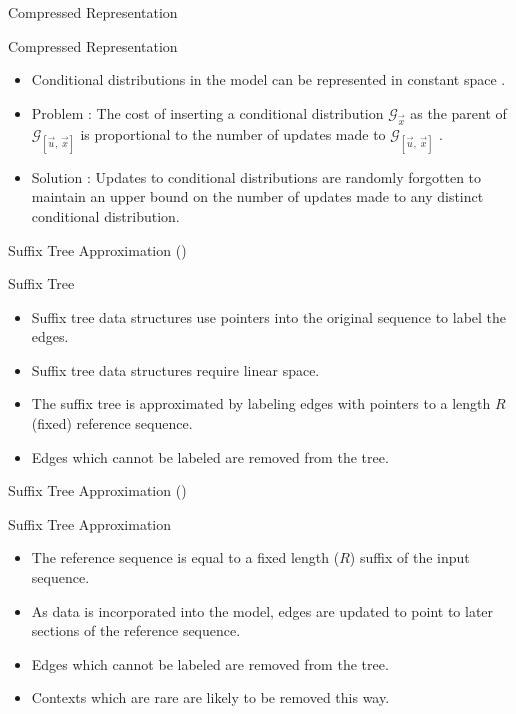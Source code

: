 \documentclass{beamer}
\newcommand{\G}{\mathcal{G}}
\begin{document}
\begin{frame}[t]{Compressed Representation}	
	\begin{block}{Compressed Representation \cite{Gasthaus2011}}
		\begin{itemize}
			\item Conditional distributions in the model can be represented in constant space \cite{Gasthaus2011}.
			\item Problem : The cost of inserting a conditional distribution $\G_{\vec x}$ as the parent of $\G_{[\vec u, \ \vec x]}$ is proportional to the number of updates made to $\G_{[\vec u, \ \vec x]}$ \cite{Gasthaus2011}.
			\item Solution : Updates to conditional distributions are randomly forgotten to maintain an upper bound on the number of updates made to any distinct conditional distribution.
		\end{itemize}
	\end{block}
\end{frame}

\begin{frame}[t]{Suffix Tree Approximation (\citet{Bartlett2011})}
	\begin{block}{Suffix Tree}
		\begin{itemize}
           \item Suffix tree data structures use pointers into the original sequence to label the edges.
			\item Suffix tree data structures require linear space.
			\item The suffix tree is approximated by labeling edges with pointers to a length $R$ (fixed) reference sequence.
			\item Edges which cannot be labeled are removed from the tree.
		\end{itemize}
	\end{block}
\end{frame}

\begin{frame}[t]{Suffix Tree Approximation  (\citet{Bartlett2011})}
	\begin{block}{Suffix Tree Approximation}
			\begin{itemize}
				\item The reference sequence is equal to a fixed length ($R$) suffix of the input sequence.
				\item As data is incorporated into the model, edges are updated to point to later sections of the reference sequence.
				\item Edges which cannot be labeled are removed from the tree.
            	\item Contexts which are rare are likely to be removed this way.
			\end{itemize}
	\end{block}
\end{frame}
\end{document}
